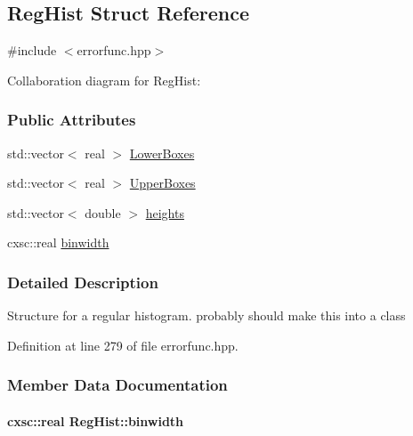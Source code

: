 \hypertarget{structRegHist}{\subsection{\-Reg\-Hist \-Struct \-Reference}
\label{structRegHist}
}


{\ttfamily \#include $<$errorfunc.\-hpp$>$}



\-Collaboration diagram for \-Reg\-Hist\-:
\subsubsection*{\-Public \-Attributes}
\begin{DoxyCompactItemize}
\item 
std\-::vector$<$ real $>$ \hyperlink{structRegHist_ac6b64da4f93f7d21cbdd2c566a7d32bf}{\-Lower\-Boxes}
\item 
std\-::vector$<$ real $>$ \hyperlink{structRegHist_a1336612a62cb90cb7dc2cf2610dc5eee}{\-Upper\-Boxes}
\item 
std\-::vector$<$ double $>$ \hyperlink{structRegHist_a587ad6fc6b0ba0a0c723efeafe299189}{heights}
\item 
cxsc\-::real \hyperlink{structRegHist_a4303d3e3de079e309a6b71a422a13947}{binwidth}
\end{DoxyCompactItemize}


\subsubsection{\-Detailed \-Description}
\-Structure for a regular histogram. probably should make this into a class 

\-Definition at line 279 of file errorfunc.\-hpp.



\subsubsection{\-Member \-Data \-Documentation}
\hypertarget{structRegHist_a4303d3e3de079e309a6b71a422a13947}{
\paragraph[{binwidth}]{\setlength{\rightskip}{0pt plus 5cm}cxsc\-::real {\bf \-Reg\-Hist\-::binwidth}}}\label{structRegHist_a4303d3e3de079e309a6b71a422a13947}


